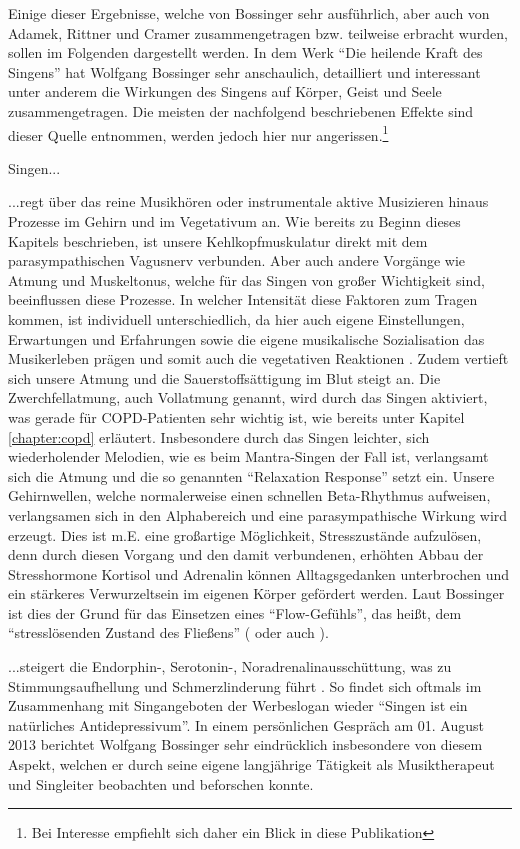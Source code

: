 Einige dieser Ergebnisse, welche von Bossinger sehr ausführlich, aber auch von Adamek, Rittner und Cramer zusammengetragen bzw. teilweise erbracht wurden, sollen im Folgenden dargestellt werden.
In dem Werk "`Die heilende Kraft des Singens"' hat Wolfgang Bossinger sehr anschaulich, detailliert und interessant unter anderem die Wirkungen des Singens auf Körper, Geist und Seele zusammengetragen. Die meisten der nachfolgend beschriebenen Effekte sind dieser Quelle entnommen, werden jedoch hier nur angerissen.\footnote{Bei Interesse empfiehlt sich daher ein Blick in diese Publikation}

Singen...

...regt über das reine Musikhören oder instrumentale aktive Musizieren hinaus Prozesse im Gehirn und im Vegetativum an. Wie bereits zu Beginn dieses Kapitels beschrieben, ist unsere Kehlkopfmuskulatur direkt mit dem parasympathischen Vagusnerv verbunden. Aber auch andere Vorgänge wie Atmung und Muskeltonus, welche für das Singen von großer Wichtigkeit sind, beeinflussen diese Prozesse. In welcher Intensität diese Faktoren zum Tragen kommen, ist individuell unterschiedlich, da hier auch eigene Einstellungen, Erwartungen und Erfahrungen sowie die eigene musikalische Sozialisation das Musikerleben prägen und somit auch die vegetativen Reaktionen \autocite[vgl.][121]{bossinger2006}. Zudem vertieft sich unsere Atmung und die Sauerstoffsättigung im Blut steigt an. Die Zwerchfellatmung, auch Vollatmung genannt, wird durch das Singen aktiviert, was gerade für COPD-Patienten sehr wichtig ist, wie bereits unter Kapitel \ref{chapter:copd} erläutert. Insbesondere durch das Singen leichter, sich wiederholender Melodien, wie es beim Mantra-Singen der Fall ist, verlangsamt sich die Atmung und die so genannten "`Relaxation Response"' setzt ein. Unsere Gehirnwellen, welche normalerweise einen schnellen Beta-Rhythmus aufweisen, verlangsamen sich in den Alphabereich und eine parasympathische Wirkung wird erzeugt. Dies ist m.E. eine großartige Möglichkeit, Stresszustände aufzulösen, denn durch diesen Vorgang und den damit verbundenen, erhöhten Abbau der Stresshormone Kortisol und Adrenalin können Alltagsgedanken unterbrochen und ein stärkeres Verwurzeltsein im eigenen Körper gefördert werden. Laut Bossinger ist dies der Grund für das Einsetzen eines "`Flow-Gefühls"', das heißt, dem "`stresslösenden Zustand des Fließens"' (\cite[vgl.][]{bossinger2014} oder auch \cite[vgl.][202ff.]{bossinger2006}).

...steigert die Endorphin-, Serotonin-, Noradrenalinausschüttung, was zu Stimmungsaufhellung und Schmerzlinderung führt \autocite[vgl.][151ff.]{bossinger2006}. So findet sich oftmals im Zusammenhang mit Singangeboten der Werbeslogan wieder "`Singen ist ein natürliches Antidepressivum"'. In einem persönlichen Gespräch am 01. August 2013 berichtet Wolfgang Bossinger sehr eindrücklich insbesondere von diesem Aspekt, welchen er durch seine eigene langjährige Tätigkeit als Musiktherapeut und Singleiter beobachten und beforschen konnte.

